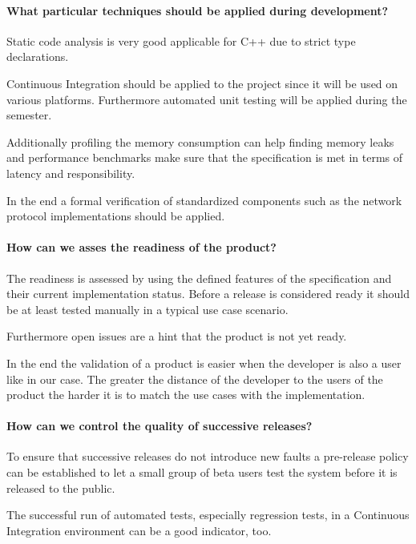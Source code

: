 \documentclass{scrartcl}
\begin{document}
\paragraph{What particular techniques should be applied during development?}

Static code analysis is very good applicable for C++ due to strict type declarations. 

Continuous Integration should be applied to the project since it will be used on various platforms. Furthermore automated unit testing will be applied during the semester.

Additionally profiling the memory consumption can help finding memory leaks and performance benchmarks make sure that the specification is met in terms of latency and responsibility.

In the end a formal verification of standardized components such as the network protocol implementations should be applied.

\paragraph{How can we asses the readiness of the product?}

The readiness is assessed by using the defined features of the specification and their current implementation status. Before a release is considered ready it should be at least tested manually in a typical use case scenario.

Furthermore open issues are a hint that the product is not yet ready.

In the end the validation of a product is easier when the developer is also a user like in our case. The greater the distance of the developer to the users of the product the harder it is to match the use cases with the implementation. 

\paragraph{How can we control the quality of successive releases?}

To ensure that successive releases do not introduce new faults a pre-release policy can be established to let a small group of beta users test the system before it is released to the public.

The successful run of automated tests, especially regression tests, in a Continuous Integration environment can be a good indicator, too.
\end{document}
